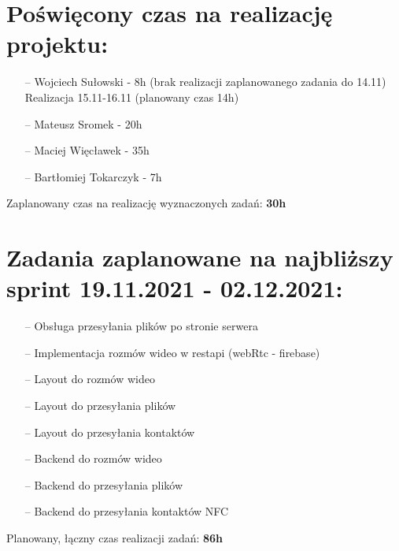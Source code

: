 \documentclass[12pt,a4paper]{article}
\begin{document}
\section{Poświęcony czas na realizację projektu:}
\begin{itemize}
    \item [--] Wojciech Sułowski - 8h (brak realizacji zaplanowanego zadania do 14.11) Realizacja 15.11-16.11 (planowany czas 14h)
    \item [--] Mateusz Sromek  - 20h
    \item [--] Maciej Więcławek - 35h
    \item [--] Bartłomiej Tokarczyk - 7h
\end{itemize}
Zaplanowany czas na realizację wyznaczonych zadań: \textbf{30h}
\section{Zadania zaplanowane na najbliższy sprint 19.11.2021 - 02.12.2021: }
\begin{itemize}
   \item [--] Obsługa przesyłania plików po stronie serwera
 

 \item [--]Implementacja rozmów wideo w restapi (webRtc - firebase)

  \item [--]Layout do rozmów wideo

   \item [--]Layout do przesyłania plików
    \item [--]Layout do przesyłania kontaktów

     \item [--] Backend do rozmów wideo
      \item [--]Backend do przesyłania plików
      \item [--]Backend do przesyłania kontaktów NFC


\end{itemize}

Planowany, łączny czas realizacji zadań:\textbf{ 86h}
\end{document}

